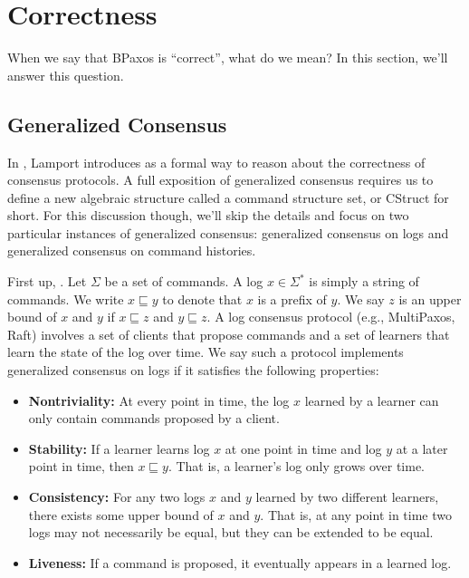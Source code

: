 \section{Correctness}
When we say that BPaxos is ``correct'', what do we mean? In this section, we'll
answer this question.

\subsection{Generalized Consensus}
In \cite{lamport2005generalized}, Lamport introduces  as a formal way to reason about the correctness of consensus
protocols. A full exposition of generalized consensus requires us to define a
new algebraic structure called a command structure set, or CStruct for short.
For this discussion though, we'll skip the details and focus on two particular
instances of generalized consensus: generalized consensus on logs and
generalized consensus on command histories.

\newcommand{\Cmd}{\Sigma}
\newcommand{\prefixof}{\sqsubseteq}
First up, . Let $\Cmd$ be a set of
commands. A log $x \in \Cmd^*$ is simply a string of commands. We write $x
\prefixof y$ to denote that $x$ is a prefix of $y$. We say $z$ is an upper
bound of $x$ and $y$ if $x \prefixof z$ and $y \prefixof z$. A log consensus
protocol (e.g., MultiPaxos, Raft) involves a set of clients that propose
commands and a set of learners that learn the state of the log over time. We
say such a protocol implements generalized consensus on logs if it satisfies
the following properties:
\begin{itemize}
  \item \textbf{Nontriviality:}
    At every point in time, the log $x$ learned by a learner can only contain
    commands proposed by a client.

  \item \textbf{Stability:}
    If a learner learns log $x$ at one point in time and log $y$ at a later
    point in time, then $x \prefixof y$. That is, a learner's log only grows
    over time.

  \item \textbf{Consistency:}
    For any two logs $x$ and $y$ learned by two different learners, there
    exists some upper bound of $x$ and $y$. That is, at any point in time two
    logs may not necessarily be equal, but they can be extended to be equal.

  \item \textbf{Liveness:}
    If a command is proposed, it eventually appears in a learned log.
\end{itemize}


